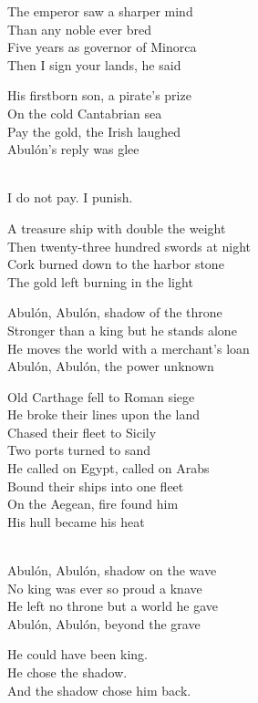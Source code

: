 \begin{lyrics}
The emperor saw a sharper mind\\
Than any noble ever bred\\
Five years as governor of Minorca\\
Then I sign your lands, he said

His firstborn son, a pirate's prize\\
On the cold Cantabrian sea\\
Pay the gold, the Irish laughed\\
Abulón's reply was glee

\\
I do not pay. %
I punish.

A treasure ship with double the weight\\
Then twenty-three hundred swords at night\\
Cork burned down to the harbor stone\\
The gold left burning in the light

Abulón, Abulón, shadow of the throne\\
Stronger than a king but he stands alone\\
He moves the world with a merchant's loan\\
Abulón, Abulón, the power unknown

Old Carthage fell to Roman siege\\
He broke their lines upon the land\\
Chased their fleet to Sicily\\
Two ports turned to sand\\
He called on Egypt, called on Arabs\\
Bound their ships into one fleet\\
On the Aegean, fire found him\\
His hull became his heat

\\
Abulón, Abulón, shadow on the wave\\
No king was ever so proud a knave\\
He left no throne but a world he gave\\
Abulón, Abulón, beyond the grave

He could have been king.\\
He chose the shadow.\\
And the shadow chose him back.

\end{lyrics}
